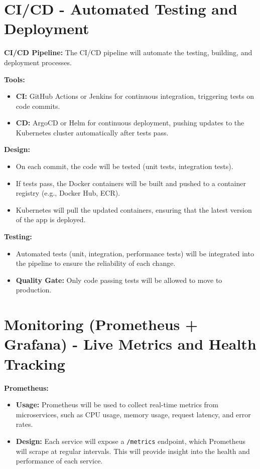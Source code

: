 \documentclass[12pt]{report}
\begin{document}
\section{CI/CD - Automated Testing and Deployment}

\textbf{CI/CD Pipeline:} The CI/CD pipeline will automate the testing, building, and deployment processes.

\textbf{Tools:}
\begin{itemize}
    \item \textbf{CI:} GitHub Actions or Jenkins for continuous integration, triggering tests on code commits.
    \item \textbf{CD:} ArgoCD or Helm for continuous deployment, pushing updates to the Kubernetes cluster automatically after tests pass.
\end{itemize}

\textbf{Design:}
\begin{itemize}
    \item On each commit, the code will be tested (unit tests, integration tests).
    \item If tests pass, the Docker containers will be built and pushed to a container registry (e.g., Docker Hub, ECR).
    \item Kubernetes will pull the updated containers, ensuring that the latest version of the app is deployed.
\end{itemize}

\textbf{Testing:}
\begin{itemize}
    \item Automated tests (unit, integration, performance tests) will be integrated into the pipeline to ensure the reliability of each change.
    \item \textbf{Quality Gate:} Only code passing tests will be allowed to move to production.
\end{itemize}
 

\section{Monitoring (Prometheus + Grafana) - Live Metrics and Health Tracking}

\textbf{Prometheus:}
\begin{itemize}
    \item \textbf{Usage:} Prometheus will be used to collect real-time metrics from microservices, such as CPU usage, memory usage, request latency, and error rates.
    \item \textbf{Design:} Each service will expose a \texttt{/metrics} endpoint, which Prometheus will scrape at regular intervals. This will provide insight into the health and performance of each service.
\end{itemize}
\end{document}
